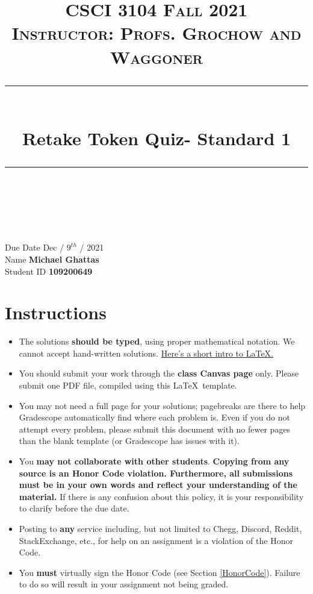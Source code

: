 \documentclass[11pt]{article}
\title{
\normalfont \normalsize 
\textsc{CSCI 3104 Fall 2021 \\ 
Instructor: Profs. Grochow and Waggoner} \\
[10pt] 
\rule{\linewidth}{0.5pt} \\[6pt] 
\huge Retake Token Quiz- Standard 1 \\
\rule{\linewidth}{2pt}  \\[10pt]
}
\date{}
\theoremstyle{definition}
\theoremstyle{definition}
\theoremstyle{definition}
\begin{document}
\maketitle


\noindent
Due Date \dotfill Dec / $9^{th}$ / 2021 \\
Name \dotfill \textbf{Michael Ghattas} \\
Student ID \dotfill \textbf{109200649} \\


\tableofcontents

\section{Instructions}
 \begin{itemize}
	\item The solutions \textbf{should be typed}, using proper mathematical notation. We cannot accept hand-written solutions. \href{http://ece.uprm.edu/~caceros/latex/introduction.pdf}{Here's a short intro to \LaTeX.}
	\item You should submit your work through the \textbf{class Canvas page} only. Please submit one PDF file, compiled using this \LaTeX \ template.
	\item You may not need a full page for your solutions; pagebreaks are there to help Gradescope automatically find where each problem is. Even if you do not attempt every problem, please submit this document with no fewer pages than the blank template (or Gradescope has issues with it).

	\item You \textbf{may not collaborate with other students}. \textbf{Copying from any source is an Honor Code violation. Furthermore, all submissions must be in your own words and reflect your understanding of the material.} If there is any confusion about this policy, it is your responsibility to clarify before the due date. 

	\item Posting to \textbf{any} service including, but not limited to Chegg, Discord, Reddit, StackExchange, etc., for help on an assignment is a violation of the Honor Code.

	\item You \textbf{must} virtually sign the Honor Code (see Section \ref{HonorCode}). Failure to do so will result in your assignment not being graded.
\end{itemize}
\end{document}
